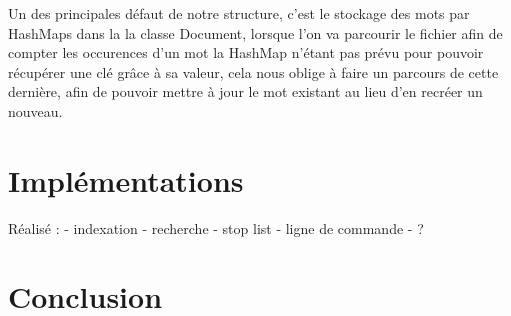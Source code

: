 \documentclass{article}
\begin{document}
Un des principales défaut de notre structure, c'est le stockage des mots par HashMaps dans la
la classe Document, lorsque l'on va parcourir le fichier afin de compter les occurences d'un
mot la HashMap n'étant pas prévu pour pouvoir récupérer une clé grâce à sa valeur, cela nous
oblige à faire un parcours de cette dernière, afin de pouvoir mettre à jour le mot existant
au lieu d'en recréer un nouveau.


\section{Implémentations}

Réalisé :
- indexation
- recherche
- stop list
- ligne de commande
- ?




\section{Conclusion}
\end{document}
